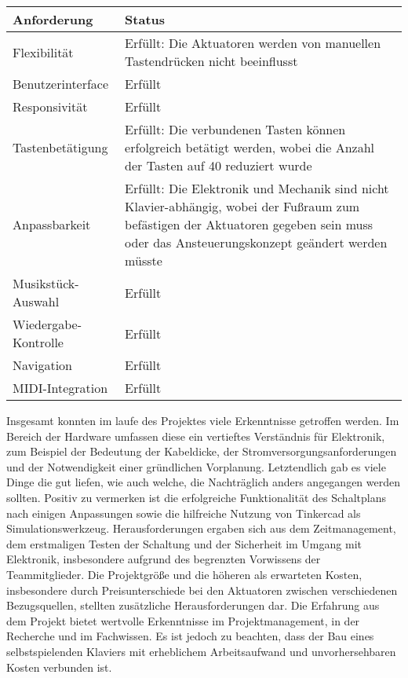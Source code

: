 \begin{tabular}{| m{4cm} | m{8cm} |}
    \hline
    \textbf{Anforderung} &  \textbf{Status}  \\
    \hline
    Flexibilität & Erfüllt: Die Aktuatoren werden von manuellen Tastendrücken nicht beeinflusst \\
    \hline
    Benutzerinterface & Erfüllt \\
    \hline
    Responsivität & Erfüllt \\
    \hline
    Tastenbetätigung & Erfüllt: Die verbundenen Tasten können erfolgreich betätigt werden, wobei die Anzahl der Tasten auf
    40 reduziert wurde\\
    \hline
    Anpassbarkeit & Erfüllt: Die Elektronik und Mechanik sind nicht Klavier-abhängig, wobei der Fußraum zum befästigen der Aktuatoren
    gegeben sein muss oder das Ansteuerungskonzept geändert werden müsste\\
    \hline
    Musikstück-Auswahl & Erfüllt \\
    \hline
    Wiedergabe-Kontrolle & Erfüllt \\
    \hline
    Navigation & Erfüllt \\
    \hline
    MIDI-Integration & Erfüllt \\
    \hline
\end{tabular} \newline
Insgesamt konnten im laufe des Projektes viele Erkenntnisse getroffen werden.
Im Bereich der Hardware umfassen diese ein vertieftes Verständnis für Elektronik, zum Beispiel der Bedeutung der
Kabeldicke, der Stromversorgungsanforderungen und der Notwendigkeit einer gründlichen Vorplanung.
Letztendlich gab es viele Dinge die gut liefen, wie auch welche, die Nachträglich anders angegangen werden sollten.
Positiv zu vermerken ist die erfolgreiche Funktionalität des Schaltplans nach einigen Anpassungen sowie die hilfreiche
Nutzung von Tinkercad als Simulationswerkzeug.
Herausforderungen ergaben sich aus dem Zeitmanagement, dem erstmaligen Testen der Schaltung und
der Sicherheit im Umgang mit Elektronik, insbesondere aufgrund des begrenzten Vorwissens der Teammitglieder. Die
Projektgröße und die höheren als erwarteten Kosten, insbesondere durch Preisunterschiede bei den Aktuatoren zwischen
verschiedenen Bezugsquellen, stellten zusätzliche Herausforderungen dar.
Die Erfahrung aus dem Projekt bietet wertvolle Erkenntnisse im Projektmanagement, in der Recherche und im
Fachwissen. Es ist jedoch zu beachten, dass der Bau eines selbstspielenden Klaviers mit erheblichem Arbeitsaufwand und
unvorhersehbaren Kosten verbunden ist.

